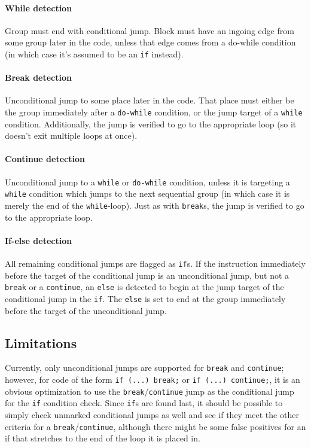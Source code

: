 \paragraph{While detection}
Group must end with conditional jump. Block must have an ingoing edge from some group later in the code, unless that edge comes from a do-while condition (in which case it's assumed to be an \verb+if+ instead).

\paragraph{Break detection}
Unconditional jump to some place later in the code. That place must either be the group immediately after a \verb+do-while+ condition, or the jump target of a \verb+while+ condition. Additionally, the jump is verified to go to the appropriate loop (so it doesn't exit multiple loops at once).

\paragraph{Continue detection}
Unconditional jump to a \verb+while+ or \verb+do-while+ condition, unless it is targeting a \verb+while+ condition which jumps to the next sequential group (in which case it is merely the end of the \verb+while+-loop). Just as with \verb+break+s, the jump is verified to go to the appropriate loop.

\paragraph{If-else detection}
All remaining conditional jumps are flagged as \verb+if+s. If the instruction immediately before the target of the conditional jump is an unconditional jump, but not a \verb+break+ or a \verb+continue+, an \verb+else+ is detected to begin at the jump target of the conditional jump in the \verb+if+. The \verb+else+ is set to end at the group immediately before the target of the unconditional jump.

\subsection{Limitations}
Currently, only unconditional jumps are supported for \verb+break+ and \verb+continue+; however, for code of the form \verb+if (...) break;+ or \verb+if (...) continue;+, it is an obvious optimization to use the \verb+break+/\verb+continue+ jump as the conditional jump for the \verb+if+ condition check. Since \verb+if+s are found last, it should be possible to simply check unmarked conditional jumps as well and see if they meet the other criteria for a \verb+break+/\verb+continue+, although there might be some false positives for an if that stretches to the end of the loop it is placed in.

